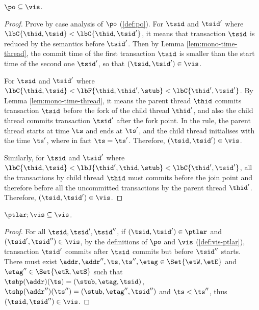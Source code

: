 \begin{lem}[Session]
    \label{lem:session}
    \( \po \subseteq \vis \).
\end{lem}   
\begin{proof}
    Prove by case analysis of \( \po \) ( \ref{def:po}).
    For \( \tsid \) and \( \tsid' \) where \( \lbC{\thid,\tsid} < \lbC{\thid,\tsid'} \), it means that transaction \( \tsid \) is reduced by the semantics before \( \tsid' \).
    Then by Lemma \ref{lem:mono-time-thread}, the commit time of the first transaction \( \tsid \) is smaller than the start time of the second one \( \tsid' \), so that \( (\tsid, \tsid') \in \vis \).

    For \( \tsid \) and \( \tsid' \) where \( \lbC{\thid,\tsid} < \lbF{\thid,\thid', \stub} < \lbC{\thid',\tsid'} \).
    By Lemma \ref{lem:mono-time-thread}, it means the parent thread \( \thid \) commits transaction \( \tsid \) before the fork of the child thread \( \thid' \), and also the child thread commits transaction \( \tsid' \) after the fork point.
    In the  rule, the parent thread starts at time \( \ts \) and ends at \( \ts' \), and the child thread initialises with the time \( \ts' \), where in fact \( \ts = \ts' \).
    Therefore, \( (\tsid, \tsid') \in \vis \).

    Similarly, for \( \tsid \) and \( \tsid' \) where \( \lbC{\thid,\tsid} < \lbJ{\thid',\thid, \stub} < \lbC{\thid',\tsid'} \), all the transactions by child thread \( \thid \) must commits before the join point and therefore before all the uncommitted transactions by the parent thread \( \thid' \).
    Therefore, \( (\tsid, \tsid') \in \vis \).
\end{proof}


\begin{lem}
    \label{lem:semi-prefix}
    \( \ptlar; \vis \subseteq \vis \).
\end{lem}
\begin{proof}
    For all \( \tsid, \tsid', \tsid'' \), if \( (\tsid, \tsid') \in \ptlar \) and \( (\tsid', \tsid'') \in \vis \), by the definitions of \( \po \) and \( \vis \) ( \ref{def:vis-ptlar}), transaction \( \tsid' \) commits after \( \tsid \) commits but before \( \tsid'' \) starts.
    There must exist \( \addr, \addr'', \ts, \ts'', \etag \in \Set{\etW, \etE}  \) and \( \etag'' \in \Set{\etR, \etS } \) such that  \( \tshp(\addr)(\ts) = (\stub, \etag, \tsid) \), \( \tshp(\addr'')(\ts'') = (\stub, \etag'', \tsid'') \) and \( \ts < \ts'' \), thus \( ( \tsid, \tsid'' ) \in \vis \).
\end{proof}

